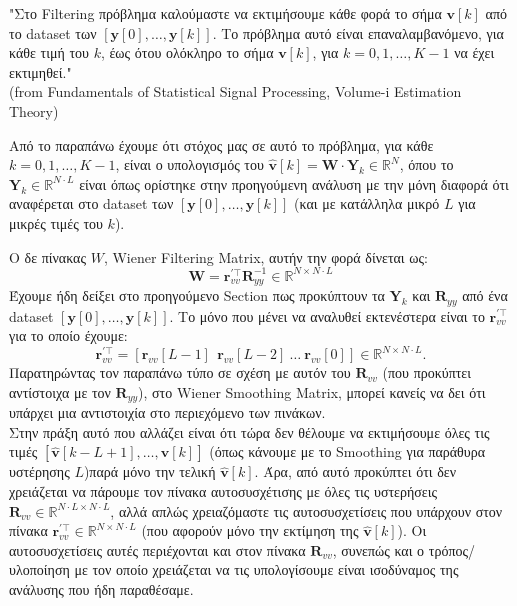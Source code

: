 \documentclass[12pt]{article} %
\begin{document}
"Στο Filtering πρόβλημα καλούμαστε να εκτιμήσουμε κάθε φορά το σήμα $\mathbf{v}[k]$ από το dataset των $[\mathbf{y}[0], \ldots, \mathbf{y}[k]]$. Το πρόβλημα αυτό είναι επαναλαμβανόμενο, για κάθε τιμή του $k$, έως ότου ολόκληρο το σήμα $\mathbf{v}[k]$, για $k = 0, 1, \ldots, K-1$ να έχει εκτιμηθεί." \\ 
(from Fundamentals of Statistical Signal Processing, Volume-i Estimation Theory)

Από το παραπάνω έχουμε ότι στόχος μας σε αυτό το πρόβλημα, για κάθε $k = 0, 1, \ldots, K-1$, είναι ο υπολογισμός του $\hat{\mathbf{v}}[k] = \mathbf{W} \cdot \mathbf{Y}_k \in \mathbb{R}^N$, όπου το $\mathbf{Y}_k\in \mathbb{R}^{N \cdot L}$ είναι όπως ορίστηκε στην προηγούμενη ανάλυση με την μόνη διαφορά ότι αναφέρεται στο dataset των $[\mathbf{y}[0], \ldots, \mathbf{y}[k]]$ (και με κατάλληλα μικρό $L$ για μικρές τιμές του $k$).

Ο δε πίνακας $W$, Wiener Filtering Matrix, αυτήν την φορά δίνεται ως:
\[
\mathbf{W} = \mathbf{r}_{vv}^{' \top}\mathbf{R}_{yy}^{-1} \in \mathbb{R}^{N \times N \cdot L}
\]
Έχουμε ήδη δείξει στο προηγούμενο Section πως προκύπτουν τα $\mathbf{Y}_k$ και $\mathbf{R}_{yy}$ από ένα dataset $[\mathbf{y}[0], \ldots, \mathbf{y}[k]]$. Το μόνο που μένει να αναλυθεί εκτενέστερα είναι το $\mathbf{r}_{vv}^{' \top}$ για το οποίο έχουμε:
\[
\mathbf{r}_{vv}^{' \top} = [\mathbf{r}_{vv}[L-1]\ \ \mathbf{r}_{vv}[L-2] \  \ldots \ \mathbf{r}_{vv}[0]] \in \mathbb{R}^{N \times N \cdot L}.
\]
Παρατηρώντας τον παραπάνω τύπο σε σχέση με αυτόν του $\mathbf{R}_{vv}$ (που προκύπτει αντίστοιχα με τον $\mathbf{R}_{yy}$), στο Wiener Smoothing Matrix, μπορεί κανείς να δει ότι υπάρχει μια αντιστοιχία στο περιεχόμενο των πινάκων. \\ 
Στην πράξη αυτό που αλλάζει είναι ότι τώρα δεν θέλουμε να εκτιμήσουμε όλες τις τιμές $[\hat{\mathbf{v}}[k-L+1], \ldots, \hat{\mathbf{v}}[k]]$ (όπως κάνουμε με το Smoothing για παράθυρα υστέρησης $L$)\textemdash παρά μόνο την τελική $\hat{\mathbf{v}}[k]$. 
Άρα, από αυτό προκύπτει ότι δεν χρειάζεται να πάρουμε τον πίνακα αυτοσυσχέτισης με όλες τις υστερήσεις $\mathbf{R}_{vv} \in \mathbb{R}^{N \cdot L \times N \cdot L}$, αλλά απλώς χρειαζόμαστε τις αυτοσυσχετίσεις που υπάρχουν στον πίνακα $\mathbf{r}_{vv}^{' \top} \in \mathbb{R}^{N \times N \cdot L}$ (που αφορούν μόνο την εκτίμηση της $\hat{\mathbf{v}}[k]$).
Οι αυτοσυσχετίσεις αυτές περιέχονται και στον πίνακα $\mathbf{R}_{vv}$, συνεπώς και ο τρόπος/υλοποίηση με τον οποίο χρειάζεται να τις υπολογίσουμε είναι ισοδύναμος της ανάλυσης που ήδη παραθέσαμε. 
\end{document}
